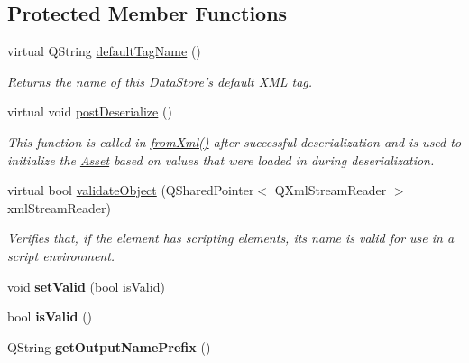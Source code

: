 \subsection*{Protected Member Functions}
\begin{DoxyCompactItemize}
\item 
virtual Q\-String \hyperlink{class_picto_1_1_analysis_output_dep_a7a0816ed8dc31e00f009b7055437b63b}{default\-Tag\-Name} ()
\begin{DoxyCompactList}\small\item\em Returns the name of this \hyperlink{class_picto_1_1_data_store}{Data\-Store}'s default X\-M\-L tag. \end{DoxyCompactList}\item 
virtual void \hyperlink{class_picto_1_1_analysis_output_dep_a1f729ac9a11524ee82e89b2725d2eda2}{post\-Deserialize} ()
\begin{DoxyCompactList}\small\item\em This function is called in \hyperlink{class_picto_1_1_asset_a8bed4da09ecb1c07ce0dab313a9aba67}{from\-Xml()} after successful deserialization and is used to initialize the \hyperlink{class_picto_1_1_asset}{Asset} based on values that were loaded in during deserialization. \end{DoxyCompactList}\item 
\hypertarget{class_picto_1_1_analysis_output_dep_ae582bad5894468e6792f10943de73a65}{virtual bool \hyperlink{class_picto_1_1_analysis_output_dep_ae582bad5894468e6792f10943de73a65}{validate\-Object} (Q\-Shared\-Pointer$<$ Q\-Xml\-Stream\-Reader $>$ xml\-Stream\-Reader)}\label{class_picto_1_1_analysis_output_dep_ae582bad5894468e6792f10943de73a65}

\begin{DoxyCompactList}\small\item\em Verifies that, if the element has scripting elements, its name is valid for use in a script environment. \end{DoxyCompactList}\item 
\hypertarget{class_picto_1_1_analysis_output_dep_a9097ccd3a7d82a7a391b700906e44d8f}{void {\bfseries set\-Valid} (bool is\-Valid)}\label{class_picto_1_1_analysis_output_dep_a9097ccd3a7d82a7a391b700906e44d8f}

\item 
\hypertarget{class_picto_1_1_analysis_output_dep_a92abf1baf7d02b72a08d6e2b37639ad0}{bool {\bfseries is\-Valid} ()}\label{class_picto_1_1_analysis_output_dep_a92abf1baf7d02b72a08d6e2b37639ad0}

\item 
\hypertarget{class_picto_1_1_analysis_output_dep_a937c6675892827ca61b308c8e9d20bcf}{Q\-String {\bfseries get\-Output\-Name\-Prefix} ()}\label{class_picto_1_1_analysis_output_dep_a937c6675892827ca61b308c8e9d20bcf}

\end{DoxyCompactItemize}
